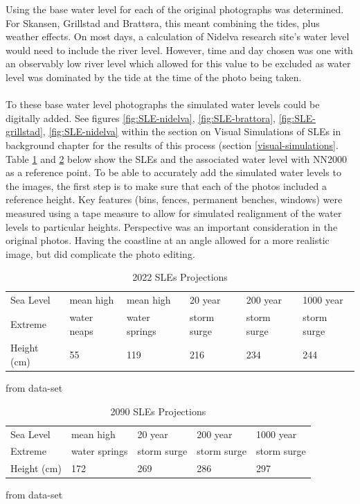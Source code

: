 Using \cite{tides_high_2022} the base water level for each of the original photographs was determined. For Skansen, Grillstad and Brattøra, this meant combining the tides, plus weather effects. On most days, a calculation of Nidelva research site's water level would need to include the river level. However, time and day chosen was one with an observably low river level which allowed for this value to be excluded as water level was dominated by the tide at the time of the photo being taken.   
\paragraph{}

To these base water level photographs the simulated water levels could be digitally added. See figures \ref{fig:SLE-nidelva}, \ref{fig:SLE-brattora}, \ref{fig:SLE-grillstad}, \ref{fig:SLE-nidelva} within the section on Visual Simulations of SLEs in background chapter for the results of this process (section \ref{visual-simulations}. Table \ref{tab:2022_sle_projections} and \ref{tab:2090_sle_projections} below show the SLEs and the associated water level with NN2000 as a reference point.  To be able to accurately add the simulated water levels to the images, the first step is to make sure that each of the photos included a reference height. Key features (bins, fences, permanent benches, windows) were measured using a tape measure to allow for simulated realignment of the water levels to particular heights. Perspective was an important consideration in the original photos. Having the coastline at an angle allowed for a more realistic image, but did complicate the photo editing. 

\begin{table}[h!]
    \centering
    \begin{tabular}{|l|l|l|l|l|l|}
    \hline
     Sea Level &   mean high  & mean high  & 20 year  & 200 year   & 1000 year  \\ \newline
     Extreme &  water neaps & water springs &  storm surge  & storm surge  &  storm surge  \\ \hline
       Height (cm) &  55 & 119 & 216 & 234 & 244 \\ \hline
    \end{tabular}
    \caption{2022 SLEs Projections } from {\cite{kartverket_se_2021} data-set}
    \label{tab:2022_sle_projections}
\end{table}

\begin{table}[h!]
    \centering
    \begin{tabular}{|l|l|l|l|l|}
    \hline
       Sea Level &  mean high & 20 year   & 200 year &  1000 year   \\ \newline
       Extreme & water springs &  storm surge  &  storm surge  &  storm surge  \\ \hline
       Height (cm) & 172 & 269 & 286 & 297 \\ \hline
    \end{tabular}
    \caption{2090 SLEs Projections}
  from {\cite{kartverket_se_2021} data-set}
    \label{tab:2090_sle_projections}
\end{table}

